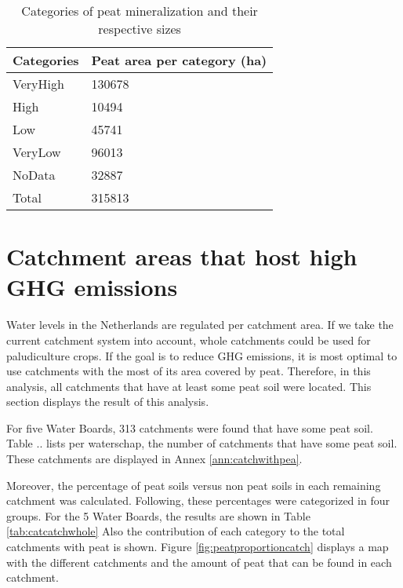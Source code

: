 \documentclass[a4paper,12pt]{scrbook}
\begin{document}
\begin{table}[htbp]
\caption{Categories of peat mineralization and their respective sizes}
\begin{center}
\begin{tabular}{|p{3cm}|p{8cm}|}
\hline
Categories & \multicolumn{1}{l|}{Peat area per category (ha)} \\ \hline
VeryHigh & 130678 \\ \hline
High & 10494 \\ \hline
Low & 45741 \\ \hline
VeryLow & 96013 \\ \hline
NoData & 32887 \\ \hline
Total & 315813 \\ \hline
\end{tabular}
\end{center}
\label{tab:sizesmincat}
\end{table}


\section{Catchment areas that host high GHG emissions }

Water levels in the Netherlands are regulated per catchment area. If we take the current catchment system into account, whole catchments could be used for paludiculture crops. If the goal is to reduce GHG emissions, it is most optimal to use catchments with the most of its area covered by peat. Therefore, in this analysis, all catchments that have at least some peat soil were located. This section displays the result of this analysis.

For five Water Boards, 313 catchments were found that have some peat soil. Table .. lists per waterschap, the number of catchments that have some peat soil. These catchments are displayed in Annex \ref{ann:catchwithpea}.

Moreover, the percentage of peat soils versus non peat soils in each remaining catchment was calculated. Following, these percentages were categorized in four groups. For the 5 Water Boards, the results are shown in Table \ref{tab:catcatchwhole} Also the contribution of each category to the total catchments with peat is shown. Figure \ref{fig:peatproportioncatch} displays a map with the different catchments and the amount of peat that can be found in each catchment.
\end{document}
